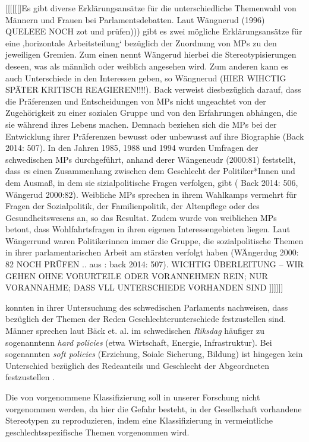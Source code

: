 \documentclass[12pt, 
    twoside=false, 
    bibliography=totoc, 
    numbers=endperiod, 
    headings=normal, 
    toc=chapterentrydotfill
    ]{scrbook}
\begin{document}
[[[[[[]Es gibt diverse Erklärungsansätze für die unterschiedliche Themenwahl von Männern und Frauen bei Parlamentsdebatten. Laut Wängnerud (1996)  QUELEEE NOCH zot  und prüfen))) gibt es zwei mögliche Erklärungsansätze für eine ‚horizontale Arbeitsteilung‘ bezüglich der Zuordnung von MPs zu den jeweiligen Gremien. Zum einen nennt Wängerud hierbei die Stereotypisierungen deseen, was als männlich oder weiblich angesehen wird. Zum anderen kann es auch Unterschiede in den Interessen geben, so Wängnerud (HIER WIHCTIG SPÄTER KRITISCH REAGIEREN!!!!). Back verweist diesbezüglich darauf, dass die Präferenzen  und Entscheidungen von MPs nicht ungeachtet von der Zugehörigkeit zu einer sozialen Gruppe und von den Erfahrungen abhängen, die sie während ihres Lebens machen. Demnach beziehen sich die MPs bei der Entwicklung ihrer Präferenzen bewusst oder unbewusst auf ihre Biographie (Back 2014: 507). 
In den Jahren 1985, 1988 und 1994 wurden Umfragen der schwedischen MPs durchgeführt, anhand derer Wängeneudr (2000:81) feststellt, dass es einen Zusammenhang zwischen dem Geschlecht der Politiker*Innen und dem Ausmaß, in dem sie sizialpolitische Fragen verfolgen, gibt ( Back 2014: 506, Wängerud 2000:82). Weibliche MPs sprechen in ihrem Wahlkamps vermehrt für Fragen der Sozialpolitik, der Familienpolitik, der Altenpflege oder des Gesundheitswesens an, so das Resultat. Zudem wurde von weiblichen MPs betont, dass Wohlfahrtsfragen in ihren eigenen Interessengebieten liegen. Laut Wängerrund waren Politikerinnen immer die Gruppe, die sozialpolitische Themen in ihrer parlamentarischen Arbeit am stärsten verfolgt haben (WÄngerdug 2000: 82 NOCH PRÜFEN .. aus : back 2014: 507). 
WICHTIG ÜBERLEITUNG – WIR GEHEN OHNE VORURTEILE ODER VORANNEHMEN REIN; NUR VORANNAHME; DASS VLL UNTERSCHIEDE VORHANDEN SIND ]]]]]]



\textcite{back_2014} konnten in ihrer Untersuchung des schwedischen Parlaments nachweisen, dass bezüglich der Themen der Reden Geschlechterunterschiede festzustellen sind. Männer sprechen laut Bäck et. al. im schwedischen \emph{Riksdag} häufiger zu sogenanntenn \emph{hard policies} (etwa Wirtschaft, Energie, Infrastruktur). Bei sogenannten \emph{soft policies} (Erziehung, Soiale Sicherung, Bildung) ist hingegen kein Unterschied bezüglich des Redeanteils und Geschlecht der Abgeordneten festzustellen \parencite[514f.]{back_2014}.

Die von \textcite{back_2014} vorgenommene Klassifizierung soll in unserer Forschung nicht vorgenommen werden, da hier die Gefahr besteht, in der Gesellschaft vorhandene Stereotypen zu reproduzieren, indem eine Klassifizierung in vermeintliche geschlechtsspezifische Themen vorgenommen wird.
\end{document}
